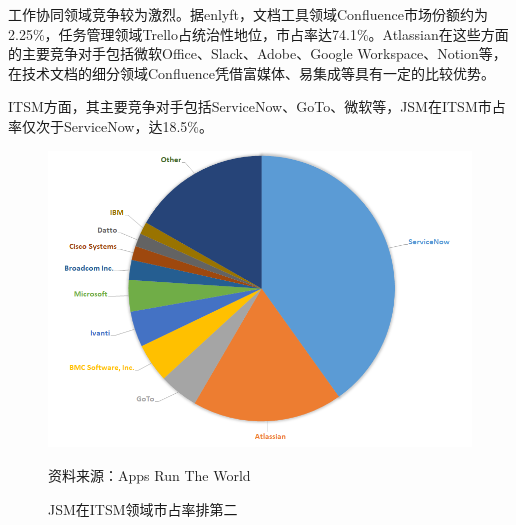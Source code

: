 工作协同领域竞争较为激烈。据enlyft，文档工具领域Confluence市场份额约为2.25\%，任务管理领域Trello占统治性地位，市占率达74.1\%。Atlassian在这些方面的主要竞争对手包括微软Office、Slack、Adobe、Google Workspace、Notion等，在技术文档的细分领域Confluence凭借富媒体、易集成等具有一定的比较优势。

ITSM方面，其主要竞争对手包括ServiceNow、GoTo、微软等，JSM在ITSM市占率仅次于ServiceNow，达18.5\%。
\begin{figure}[H]
    \caption{JSM在ITSM领域市占率排第二}
    \begin{center}
        \includegraphics[width=0.9\linewidth]{img/JSM.png}
    \end{center}
    \footnotesize{资料来源：Apps Run The World}
\end{figure}
